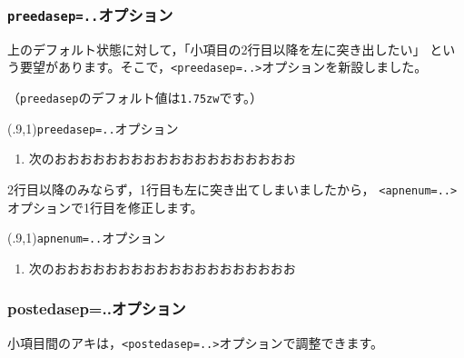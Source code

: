 \documentclass[fleqn,a4j]{jarticle}
\begin{document}
\subsubsection{\texttt{preedasep=..}オプション}
上のデフォルト状態に対して，「小項目の2行目以降を左に突き出したい」
という要望があります。そこで，\verb+<preedasep=..>+オプションを新設しました。

（\texttt{preedasep}のデフォルト値は\texttt{1.75zw}です。）
\newpage

\begin{showEx}(.9,1){\texttt{preedasep=..}オプション}
\begin{enumerate}[1.~]
  \item 次のおおおおおおおおおおおおおおおおおおお
\end{enumerate}
\end{showEx}

2行目以降のみならず，1行目も左に突き出てしまいましたから，
\verb+<apnenum=..>+オプションで1行目を修正します。

\begin{showEx}(.9,1){\texttt{apnenum=..}オプション}
\begin{enumerate}[1.~]
  \item 次のおおおおおおおおおおおおおおおおおおお
\end{enumerate}
\end{showEx}

\subsubsection{\textsf{postedasep=..}オプション}
小項目間のアキは，\verb+<postedasep=..>+オプションで調整できます。
\end{document}
